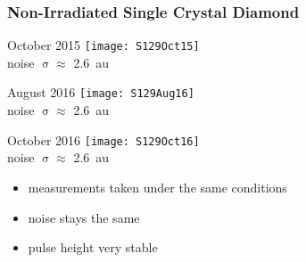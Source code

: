 \begin{frame}
	\frametitle{Non-Irradiated Single Crystal Diamond}
	\def \sp {3.7cm}
	\begin{minipage}{\sp}
		\centering
		October 2015 
		\texttt{[image: S129Oct15]}\\
		noise $\upsigma\approx$ \SI{2.6}{au}
	\end{minipage}
	\hspace*{2pt}
	\begin{minipage}{\sp}
		\centering
		August 2016
		\texttt{[image: S129Aug16]}\\
		noise $\upsigma\approx$ \SI{2.6}{au}
	\end{minipage}
	\hspace*{2pt}
	\begin{minipage}{\sp}
		\centering
		October 2016
		\texttt{[image: S129Oct16]}\\
		noise $\upsigma \approx$ \SI{2.6}{au}
	\end{minipage}\s
	\begin{itemize}
		\item measurements taken under the same conditions
		\item noise stays the same
		\item pulse height very stable
	\end{itemize}
\end{frame}
